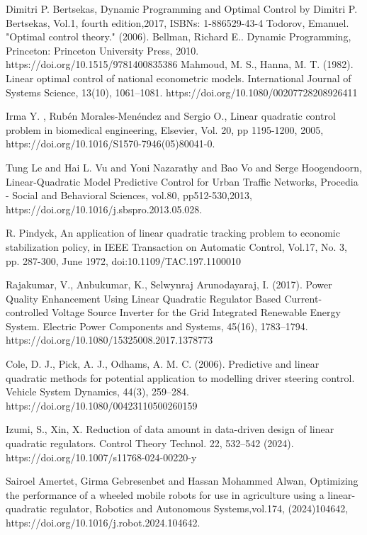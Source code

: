 \documentclass[12pt]{article}
\begin{document}
\begin{thebibliography}{99}
Dimitri P. Bertsekas, Dynamic Programming and Optimal Control
by Dimitri P. Bertsekas, Vol.1, fourth edition,2017,
ISBNs: 1-886529-43-4
Todorov, Emanuel. "Optimal control theory." (2006).
Bellman, Richard E.. Dynamic Programming, Princeton: Princeton University Press, 2010. https://doi.org/10.1515/9781400835386
Mahmoud, M. S.,  Hanna, M. T. (1982). Linear optimal control of national econometric models. International Journal of Systems Science, 13(10), 1061–1081. https://doi.org/10.1080/00207728208926411

Irma Y. , Rubén Morales-Menéndez and Sergio O.,
Linear quadratic control problem in biomedical engineering, Elsevier, Vol. 20,
pp 1195-1200, 2005,
 https://doi.org/10.1016/S1570-7946(05)80041-0.

Tung Le and Hai L. Vu and Yoni Nazarathy and Bao Vo and Serge Hoogendoorn, Linear-Quadratic Model Predictive Control for Urban Traffic Networks, Procedia - Social and Behavioral Sciences, vol.80, pp512-530,2013,
https://doi.org/10.1016/j.sbspro.2013.05.028.

R. Pindyck, An application of linear quadratic tracking problem to economic stabilization policy, in IEEE Transaction on Automatic Control, Vol.17, No. 3, pp. 287-300, June 1972, doi:10.1109/TAC.197.1100010

Rajakumar, V., Anbukumar, K., Selwynraj Arunodayaraj, I. (2017). Power Quality Enhancement Using Linear Quadratic Regulator Based Current-controlled Voltage Source Inverter for the Grid Integrated Renewable Energy System. Electric Power Components and Systems, 45(16), 1783–1794. https://doi.org/10.1080/15325008.2017.1378773

Cole, D. J., Pick, A. J.,  Odhams, A. M. C. (2006). Predictive and linear quadratic methods for potential application to modelling driver steering control. Vehicle System Dynamics, 44(3), 259–284. https://doi.org/10.1080/00423110500260159

Izumi, S., Xin, X. Reduction of data amount in data-driven design of linear quadratic regulators. Control Theory Technol. 22, 532–542 (2024). https://doi.org/10.1007/s11768-024-00220-y

Sairoel Amertet, Girma Gebresenbet and Hassan Mohammed Alwan, Optimizing the performance of a wheeled mobile robots for use in agriculture using a linear-quadratic regulator, Robotics and Autonomous Systems,vol.174,
(2024)104642,
https://doi.org/10.1016/j.robot.2024.104642.


\end{thebibliography}
\end{document}
